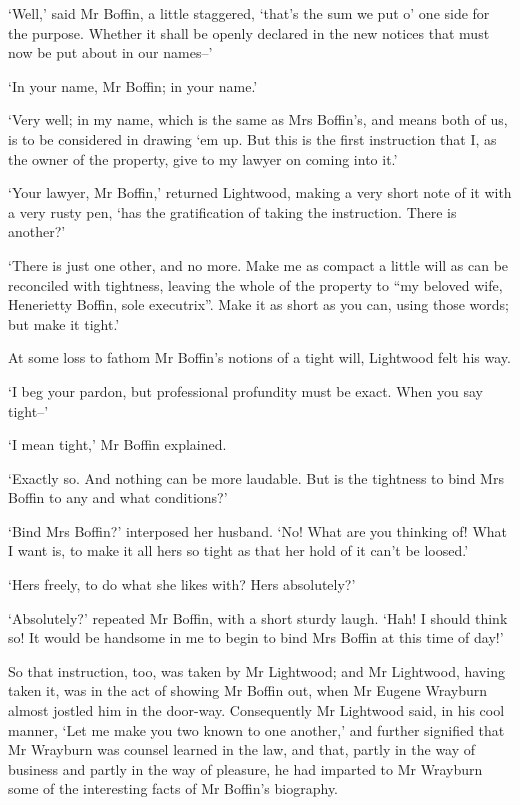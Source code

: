 ‘Well,’ said Mr Boffin, a little staggered, ‘that’s the sum we put o’
one side for the purpose. Whether it shall be openly declared in the new
notices that must now be put about in our names--’

‘In your name, Mr Boffin; in your name.’

‘Very well; in my name, which is the same as Mrs Boffin’s, and means
both of us, is to be considered in drawing ‘em up. But this is the first
instruction that I, as the owner of the property, give to my lawyer on
coming into it.’

‘Your lawyer, Mr Boffin,’ returned Lightwood, making a very short
note of it with a very rusty pen, ‘has the gratification of taking the
instruction. There is another?’

‘There is just one other, and no more. Make me as compact a little will
as can be reconciled with tightness, leaving the whole of the property
to “my beloved wife, Henerietty Boffin, sole executrix”. Make it as
short as you can, using those words; but make it tight.’

At some loss to fathom Mr Boffin’s notions of a tight will, Lightwood
felt his way.

‘I beg your pardon, but professional profundity must be exact. When you
say tight--’

‘I mean tight,’ Mr Boffin explained.

‘Exactly so. And nothing can be more laudable. But is the tightness to
bind Mrs Boffin to any and what conditions?’

‘Bind Mrs Boffin?’ interposed her husband. ‘No! What are you thinking
of! What I want is, to make it all hers so tight as that her hold of it
can’t be loosed.’

‘Hers freely, to do what she likes with? Hers absolutely?’

‘Absolutely?’ repeated Mr Boffin, with a short sturdy laugh. ‘Hah! I
should think so! It would be handsome in me to begin to bind Mrs Boffin
at this time of day!’

So that instruction, too, was taken by Mr Lightwood; and Mr Lightwood,
having taken it, was in the act of showing Mr Boffin out, when Mr Eugene
Wrayburn almost jostled him in the door-way. Consequently Mr Lightwood
said, in his cool manner, ‘Let me make you two known to one another,’
and further signified that Mr Wrayburn was counsel learned in the
law, and that, partly in the way of business and partly in the way of
pleasure, he had imparted to Mr Wrayburn some of the interesting facts
of Mr Boffin’s biography.

